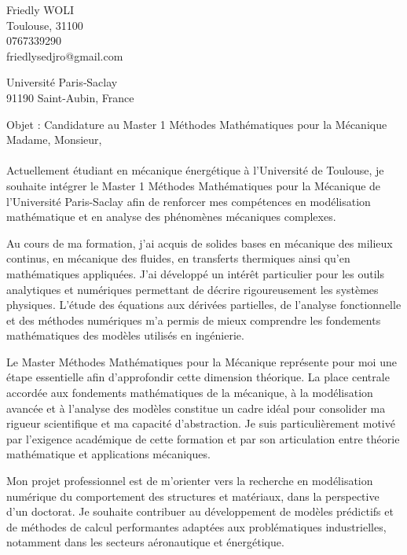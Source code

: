 \documentclass[11pt,a4paper]{article}
\begin{document}
	\pagestyle{empty}
	
	\noindent
	Friedly WOLI \\  %
	Toulouse, 31100  \\
	0767339290 \\
	friedlysedjro@gmail.com 
	
	\begin{flushright}
		
		Université Paris‑Saclay \\
		91190 Saint-Aubin, France
	\end{flushright}
	
	
	\bigskip
	
	
	
	
	
Objet : Candidature au Master 1 Méthodes Mathématiques pour la Mécanique \\
	
	Madame, Monsieur,\\
	\\
		Actuellement étudiant en mécanique énergétique à l’Université de Toulouse, je souhaite intégrer le Master 1 Méthodes Mathématiques pour la Mécanique de l’Université Paris-Saclay afin de renforcer mes compétences en modélisation mathématique et en analyse des phénomènes mécaniques complexes.
		
		Au cours de ma formation, j’ai acquis de solides bases en mécanique des milieux continus, en mécanique des fluides, en transferts thermiques ainsi qu’en mathématiques appliquées. J’ai développé un intérêt particulier pour les outils analytiques et numériques permettant de décrire rigoureusement les systèmes physiques. L’étude des équations aux dérivées partielles, de l’analyse fonctionnelle et des méthodes numériques m’a permis de mieux comprendre les fondements mathématiques des modèles utilisés en ingénierie.
		
		Le Master Méthodes Mathématiques pour la Mécanique représente pour moi une étape essentielle afin d’approfondir cette dimension théorique. La place centrale accordée aux fondements mathématiques de la mécanique, à la modélisation avancée et à l’analyse des modèles constitue un cadre idéal pour consolider ma rigueur scientifique et ma capacité d’abstraction. Je suis particulièrement motivé par l’exigence académique de cette formation et par son articulation entre théorie mathématique et applications mécaniques.
		
		Mon projet professionnel est de m’orienter vers la recherche en modélisation numérique du comportement des structures et matériaux, dans la perspective d’un doctorat. Je souhaite contribuer au développement de modèles prédictifs et de méthodes de calcul performantes adaptées aux problématiques industrielles, notamment dans les secteurs aéronautique et énergétique.
		
\end{document}
